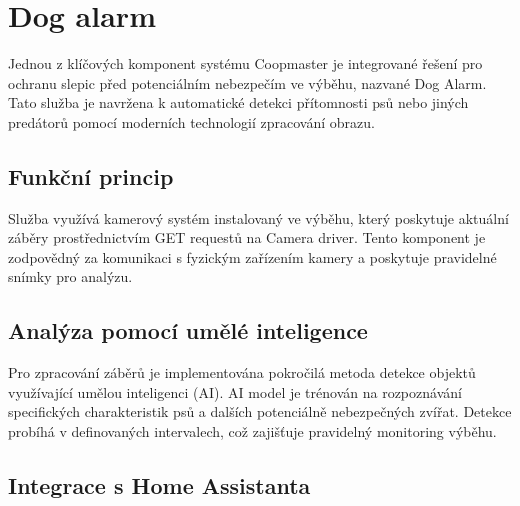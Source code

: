 \section{Dog alarm}\label{sec:dog-alarm}


Jednou z klíčových komponent systému Coopmaster je integrované řešení pro ochranu slepic před potenciálním nebezpečím ve výběhu, nazvané Dog Alarm.
Tato služba je navržena k automatické detekci přítomnosti psů nebo jiných predátorů pomocí moderních technologií zpracování obrazu.

\subsection*{Funkční princip}

Služba využívá kamerový systém instalovaný ve výběhu, který poskytuje aktuální záběry prostřednictvím GET requestů na Camera driver.
Tento komponent je zodpovědný za komunikaci s fyzickým zařízením kamery a poskytuje pravidelné snímky pro analýzu.

\subsection*{Analýza pomocí umělé inteligence}

Pro zpracování záběrů je implementována pokročilá metoda detekce objektů využívající umělou inteligenci (AI). AI model je trénován na rozpoznávání specifických charakteristik psů a dalších potenciálně nebezpečných zvířat.
Detekce probíhá v definovaných intervalech, což zajišťuje pravidelný monitoring výběhu.

\subsection*{Integrace s Home Assistanta}


